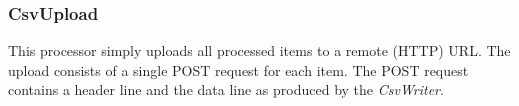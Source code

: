 \subsubsection{CsvUpload}

This processor simply uploads all processed items to a remote (HTTP)
URL. The upload consists of a single POST request for each item. The
POST request contains a header line and the data line as produced by the
\emph{CsvWriter}.

